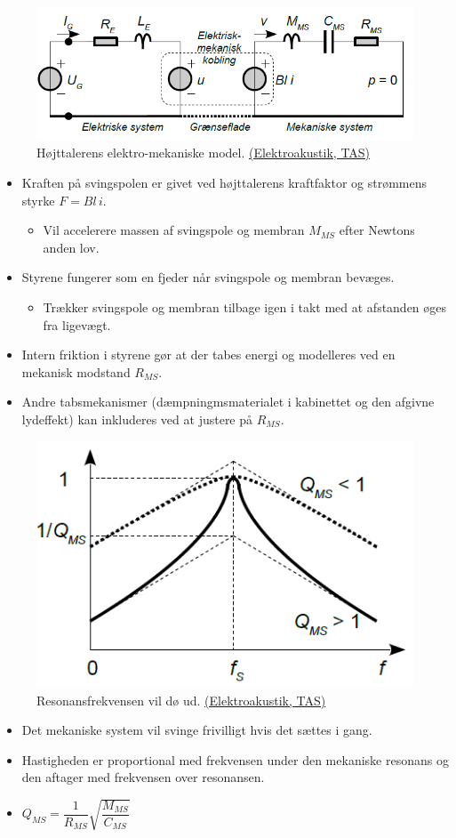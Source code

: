 \begin{figure} [H]
	\centering
	\includegraphics[width=0.95\linewidth]{graphics/24.png}
	\caption{Højttalerens elektro-mekaniske model. \href{http://www.torean.dk/artikel/Elektroakustik.pdf}{(Elektroakustik, TAS)}}
	\label{fig:24}
\end{figure}
\begin{itemize}
	\item Kraften på svingspolen er givet ved højttalerens kraftfaktor og strømmens styrke $F = Bl\, i$.
	\begin{itemize}
		\item Vil accelerere massen af svingspole og membran $M_{MS}$ efter Newtons anden lov. 
	\end{itemize} 	
	\item Styrene fungerer som en fjeder når svingspole og	membran bevæges.
	\begin{itemize}
		\item Trækker svingspole og membran tilbage igen i takt med at
		afstanden øges fra ligevægt.
	\end{itemize} 
	\item Intern friktion i styrene gør at der tabes energi og modelleres ved
	en mekanisk modstand $R_{MS}$. 
	\item Andre tabsmekanismer (dæmpningmsmaterialet i kabinettet og den afgivne lydeffekt) kan inkluderes ved at justere på $R_{MS}$.
\end{itemize}

\begin{figure} [H]
	\centering
	\includegraphics[width=0.6\linewidth]{graphics/26.png}
	\caption{Resonansfrekvensen vil dø ud. \href{http://www.torean.dk/artikel/Elektroakustik.pdf}{(Elektroakustik, TAS)}}
	\label{fig:26}
\end{figure}
\begin{itemize}
	\item Det mekaniske system vil svinge frivilligt hvis det sættes i gang.
	\item Hastigheden er proportional med frekvensen under den mekaniske resonans og den	aftager med frekvensen over resonansen.
	\item $Q_{MS}= \dfrac{1}{R_{MS}}\sqrt{\dfrac{M_{MS}}{C_{MS}}}$
\end{itemize}

